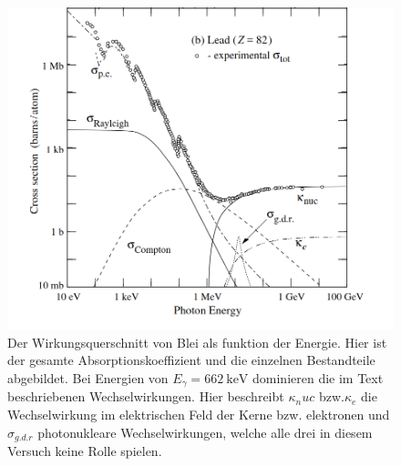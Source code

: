 \begin{figure}
    \centering
    \includegraphics[width = \linewidth]{content/Absorb.png}
    \caption{Der Wirkungsquerschnitt von Blei als funktion der Energie. Hier ist der gesamte Absorptionskoeffizient und die einzelnen Bestandteile abgebildet. Bei Energien von $E_{\gamma} = \SI{662}{\keV}$ dominieren die im Text beschriebenen Wechselwirkungen. Hier beschreibt $\kappa_nuc$ bzw.$ \kappa_{e}$ die Wechselwirkung im elektrischen Feld der Kerne bzw. elektronen und $\sigma_{g.d.r}$ photonukleare Wechselwirkungen, welche alle drei in diesem Versuch keine Rolle spielen.  \cite{pdg}}
    \label{fig:sigma}
\end{figure}
